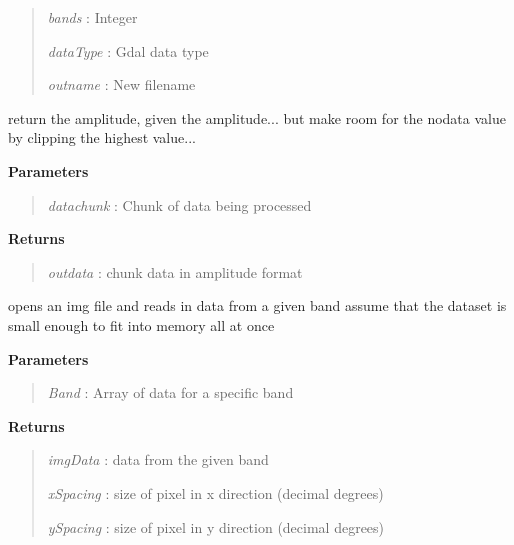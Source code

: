 \documentclass[letterpaper,10pt,openany,oneside]{sphinxmanual}
\begin{document}
\begin{fulllineitems}
\begin{fulllineitems}
\begin{quote}
\emph{bands}    : Integer

\emph{dataType} : Gdal data type

\emph{outname}  : New filename
\end{quote}

\end{fulllineitems}


\begin{fulllineitems}
\label{code:Image.Image.getAmp}
return the amplitude, given the amplitude... but make room for
the nodata value by clipping the highest value...

\textbf{Parameters}
\begin{quote}

\emph{datachunk} : Chunk of data being processed
\end{quote}

\textbf{Returns}
\begin{quote}

\emph{outdata} : chunk data in amplitude format
\end{quote}

\end{fulllineitems}


\begin{fulllineitems}
\label{code:Image.Image.getBandData}
opens an img file and reads in data from a given band
assume that the dataset is small enough to fit into memory all at once

\textbf{Parameters}
\begin{quote}

\emph{Band} : Array of data for a specific band
\end{quote}

\textbf{Returns}
\begin{quote}

\emph{imgData}  : data from the given band

\emph{xSpacing} : size of pixel in x direction (decimal degrees)

\emph{ySpacing} : size of pixel in y direction (decimal degrees)
\end{quote}

\end{fulllineitems}


\end{fulllineitems}
\end{document}

